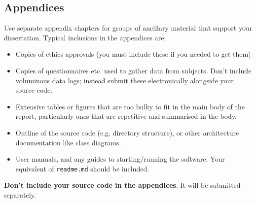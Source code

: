 \documentclass{l4proj}
\begin{document}
\begin{appendices}

\chapter{Appendices}
\label{ch:appendix}

Use separate appendix chapters for groups of ancillary material that support your dissertation. 
Typical inclusions in the appendices are:

\begin{itemize}
\item
  Copies of ethics approvals (you must include these if you needed to get them)
\item
  Copies of questionnaires etc. used to gather data from subjects. Don't include
  voluminous data logs; instead submit these electronically alongside your source code.
\item
  Extensive tables or figures that are too bulky to fit in the main body of
  the report, particularly ones that are repetitive and summarised in the body.
\item Outline of the source code (e.g. directory structure), 
    or other architecture documentation like class diagrams.
\item User manuals, and any guides to starting/running the software. 
Your equivalent of \texttt{readme.md} should be included.

\end{itemize}

\textbf{Don't include your source code in the appendices}. It will be
submitted separately.



\end{appendices}





\renewcommand{\thechapter}{0} 

\end{document}
